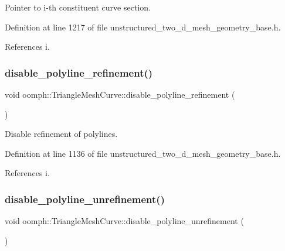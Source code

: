 Pointer to i-\/th constituent curve section. 



Definition at line 1217 of file unstructured\+\_\+two\+\_\+d\+\_\+mesh\+\_\+geometry\+\_\+base.\+h.



References i.

\mbox{\label{classoomph_1_1TriangleMeshCurve_a840a3a0c871907660d4ebe571cf36960}} 
\subsubsection{\texorpdfstring{disable\+\_\+polyline\+\_\+refinement()}{disable\_polyline\_refinement()}}
{\footnotesize\ttfamily void oomph\+::\+Triangle\+Mesh\+Curve\+::disable\+\_\+polyline\+\_\+refinement (\begin{DoxyParamCaption}{ }\end{DoxyParamCaption})\hspace{0.3cm}{\ttfamily [inline]}}



Disable refinement of polylines. 



Definition at line 1136 of file unstructured\+\_\+two\+\_\+d\+\_\+mesh\+\_\+geometry\+\_\+base.\+h.



References i.

\mbox{\label{classoomph_1_1TriangleMeshCurve_a43036d1d42da58555ebe9b9ad2036a9c}} 
\subsubsection{\texorpdfstring{disable\+\_\+polyline\+\_\+unrefinement()}{disable\_polyline\_unrefinement()}}
{\footnotesize\ttfamily void oomph\+::\+Triangle\+Mesh\+Curve\+::disable\+\_\+polyline\+\_\+unrefinement (\begin{DoxyParamCaption}{ }\end{DoxyParamCaption})\hspace{0.3cm}{\ttfamily [inline]}}



